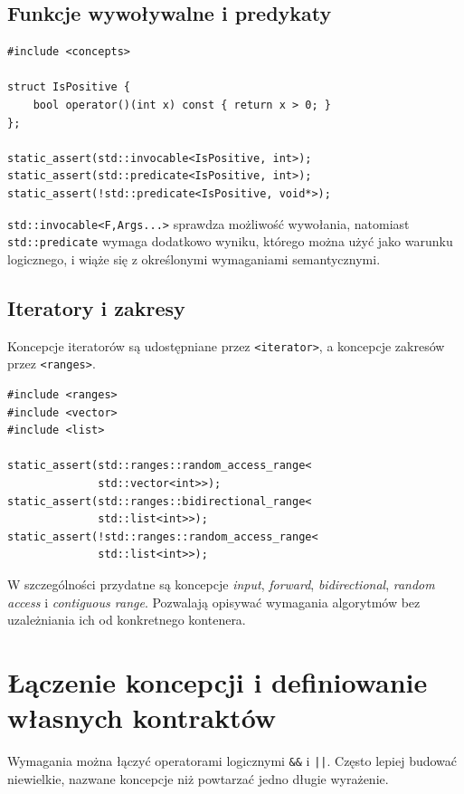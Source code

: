 \subsection{Funkcje wywoływalne i predykaty}

\begin{lstlisting}
#include <concepts>

struct IsPositive {
    bool operator()(int x) const { return x > 0; }
};

static_assert(std::invocable<IsPositive, int>);
static_assert(std::predicate<IsPositive, int>);
static_assert(!std::predicate<IsPositive, void*>);
\end{lstlisting}

\texttt{std::invocable<F,Args...>} sprawdza możliwość wywołania,
natomiast \texttt{std::predicate} wymaga dodatkowo wyniku,
którego można użyć jako warunku logicznego, i wiąże się
z określonymi wymaganiami semantycznymi.

\subsection{Iteratory i zakresy}

Koncepcje iteratorów są udostępniane przez \texttt{<iterator>},
a koncepcje zakresów przez \texttt{<ranges>}.

\begin{lstlisting}
#include <ranges>
#include <vector>
#include <list>

static_assert(std::ranges::random_access_range<
              std::vector<int>>);
static_assert(std::ranges::bidirectional_range<
              std::list<int>>);
static_assert(!std::ranges::random_access_range<
              std::list<int>>);
\end{lstlisting}

W szczególności przydatne są koncepcje \emph{input},
\emph{forward}, \emph{bidirectional}, \emph{random access}
i \emph{contiguous range}. Pozwalają opisywać wymagania
algorytmów bez uzależniania ich od konkretnego kontenera.

\section{Łączenie koncepcji i definiowanie własnych kontraktów}

Wymagania można łączyć operatorami logicznymi
\texttt{\&\&} i \texttt{||}. Często lepiej budować niewielkie,
nazwane koncepcje niż powtarzać jedno długie wyrażenie.

